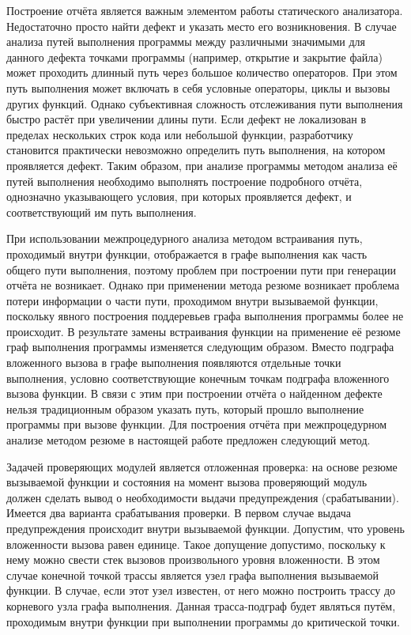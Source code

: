 Построение отчёта является важным элементом работы статического анализатора. Недостаточно просто найти дефект и указать место его возникновения. В случае анализа путей выполнения программы между различными значимыми для данного дефекта точками программы (например, открытие и закрытие файла) может проходить длинный путь через большое количество операторов. При этом путь выполнения может включать в себя условные операторы, циклы и вызовы других функций. Однако субъективная сложность отслеживания пути выполнения быстро растёт при увеличении длины пути. Если дефект не локализован в пределах нескольких строк кода или небольшой функции, разработчику становится практически невозможно определить путь выполнения, на котором проявляется дефект. Таким образом, при анализе программы методом анализа её путей выполнения необходимо выполнять построение подробного отчёта, однозначно указывающего условия, при которых проявляется дефект, и соответствующий им путь выполнения.

При использовании межпроцедурного анализа методом встраивания путь, проходимый внутри функции, отображается в графе выполнения как часть общего пути выполнения, поэтому проблем при построении пути при генерации отчёта не возникает. Однако при применении метода резюме возникает проблема потери информации о части пути, проходимом внутри вызываемой функции, поскольку явного построения поддеревьев графа выполнения программы более не происходит. В результате замены встраивания функции на применение её резюме граф выполнения программы изменяется следующим образом. Вместо подграфа вложенного вызова в графе выполнения появляются отдельные точки выполнения, условно соответствующие конечным точкам подграфа вложенного вызова функции. В связи с этим при построении отчёта о найденном дефекте нельзя традиционным образом указать путь, который прошло выполнение программы при вызове функции. Для построения отчёта  при межпроцедурном анализе методом резюме в настоящей работе предложен следующий метод.

Задачей проверяющих модулей является отложенная проверка: на основе резюме вызываемой функции и состояния на момент вызова проверяющий модуль должен сделать вывод о необходимости выдачи предупреждения (срабатывании). Имеется два варианта срабатывания проверки. В первом случае выдача предупреждения происходит внутри вызываемой функции. Допустим, что уровень вложенности вызова равен единице. Такое допущение допустимо, поскольку к нему можно свести стек вызовов произвольного уровня вложенности. В этом случае конечной точкой трассы является узел графа выполнения вызываемой функции. В случае, если этот узел известен, от него можно построить трассу до корневого узла графа выполнения. Данная трасса-подграф будет являться путём, проходимым внутри функции при выполнении программы до критической точки.


